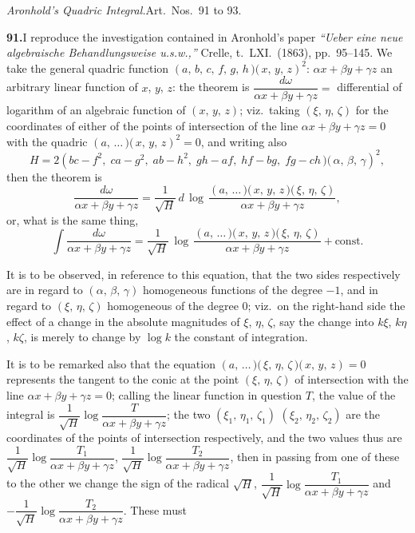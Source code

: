 \documentclass[11pt,a4paper]{article}
\begin{document}
\medskip\noindent\textit{Aronhold's Quadric Integral.}\quad Art.\ Nos.\ 91 to 93.

\medskip\noindent\textbf{91.}\quad I reproduce the investigation contained in Aronhold's paper \textit{``Ueber eine neue algebraische Behandlungsweise u.s.w.,''} Crelle, t.\ LXI.\ (1863), pp.\ 95--145. We take the general quadric function $(a,\,b,\,c,\,f,\,g,\,h\!\,\mbox{$)\!($}\,x,\,y,\,z)^2$: $\alpha x + \beta y + \gamma z$ an arbitrary linear function of $x$, $y$, $z$: the theorem is $\dfrac{d\omega}{\alpha x + \beta y + \gamma z} = $ differential of logarithm of an algebraic function of $(x,\,y,\,z)$; viz.\ taking $(\xi,\,\eta,\,\zeta)$ for the coordinates of either of the points of intersection of the line $\alpha x + \beta y + \gamma z = 0$ with the quadric $(a,\,\ldots\!\,\mbox{$)\!($}\,x,\,y,\,z)^2 = 0$, and writing also
\[
H = 2(bc - f^2,\;ca - g^2,\;ab - h^2,\;gh - af,\;hf - bg,\;fg - ch\!\,\mbox{$)\!($}\,\alpha,\,\beta,\,\gamma)^2,
\]
then the theorem is
\[
\frac{d\omega}{\alpha x + \beta y + \gamma z} = \frac{1}{\sqrt{H}}\,d\,\log\,\frac{(a,\,\ldots\!\,\mbox{$)\!($}\,x,\,y,\,z\,\mbox{$)\!($}\,\xi,\,\eta,\,\zeta)}{\alpha x + \beta y + \gamma z},
\]
or, what is the same thing,
\[
\int\frac{d\omega}{\alpha x + \beta y + \gamma z} = \frac{1}{\sqrt{H}}\,\log\,\frac{(a,\,\ldots\!\,\mbox{$)\!($}\,x,\,y,\,z\,\mbox{$)\!($}\,\xi,\,\eta,\,\zeta)}{\alpha x + \beta y + \gamma z} + \text{const.}
\]

It is to be observed, in reference to this equation, that the two sides respectively are in regard to $(\alpha,\,\beta,\,\gamma)$ homogeneous functions of the degree $-1$, and in regard to $(\xi,\,\eta,\,\zeta)$ homogeneous of the degree $0$; viz.\ on the right-hand side the effect of a change in the absolute magnitudes of $\xi$, $\eta$, $\zeta$, say the change into $k\xi$, $k\eta$, $k\zeta$, is merely to change by $\log k$ the constant of integration.

It is to be remarked also that the equation $(a,\,\ldots\!\,\mbox{$)\!($}\,\xi,\,\eta,\,\zeta\,\mbox{$)\!($}\,x,\,y,\,z) = 0$ represents the tangent to the conic at the point $(\xi,\,\eta,\,\zeta)$ of intersection with the line $\alpha x + \beta y + \gamma z = 0$; calling the linear function in question $T$, the value of the integral is $\dfrac{1}{\sqrt{H}}\log\dfrac{T}{\alpha x + \beta y + \gamma z}$; the two $(\xi_1,\,\eta_1,\,\zeta_1)$ $(\xi_2,\,\eta_2,\,\zeta_2)$ are the coordinates of the points of intersection respectively, and the two values thus are $\dfrac{1}{\sqrt{H}}\log\dfrac{T_1}{\alpha x + \beta y + \gamma z}$, $\dfrac{1}{\sqrt{H}}\log\dfrac{T_2}{\alpha x + \beta y + \gamma z}$, then in passing from one of these to the other we change the sign of the radical $\sqrt{H}$, $\dfrac{1}{\sqrt{H}}\log\dfrac{T_1}{\alpha x + \beta y + \gamma z}$ and $-\dfrac{1}{\sqrt{H}}\log\dfrac{T_2}{\alpha x + \beta y + \gamma z}$. These must
\end{document}
